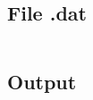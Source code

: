 \subsection{File .dat}
\inputminted[bgcolor=bg, breaklines, fontsize=\small]{haskell}{opl/scenario-2.dat}

\subsection{Output}
